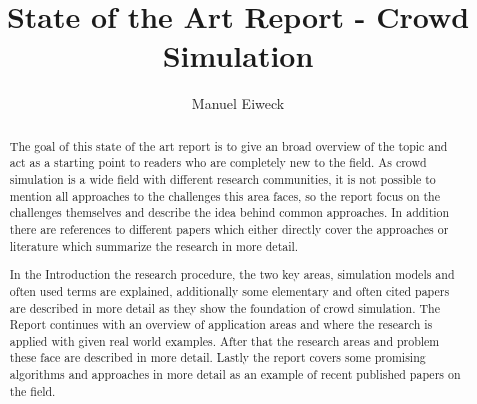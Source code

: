 \documentclass[sigconf]{acmart}
\begin{document}
\title{State of the Art Report - Crowd Simulation}

\author{Manuel Eiweck}


\renewcommand{\shortauthors}{Manuel Eiweck}

\begin{abstract}
The goal of this state of the art report is to give an broad overview of the topic and act as a starting point to readers who are completely new to the field. As crowd simulation is a wide field with different research communities, it is not possible to mention all approaches to the challenges this area faces, so the report focus on the challenges themselves and describe the idea behind common approaches. In addition there are references to different papers which either directly cover the approaches or literature which summarize the research in more detail.

In the Introduction the research procedure, the two key areas, simulation models and often used terms are explained, additionally some elementary and often cited papers are described in more detail as they show the foundation of crowd simulation. The Report continues with an overview of application areas and where the research is applied with given real world examples. After that the research areas and problem these face are described in more detail. Lastly the report covers some promising algorithms and approaches in more detail as an example of recent published papers on the field.
\end{abstract}
\end{document}
